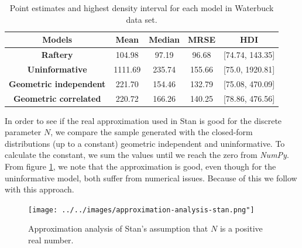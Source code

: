 \begin{table}[!ht]
    \centering
    \begin{tabular}{|c|c|c|c|c|}
        \hline
        {\bf Models} &     {\bf Mean} &  {\bf Median} &    {\bf MRSE} &    {\bf HDI} \\\hline
        {\bf Raftery} &   104.98 &   97.19 &   96.68 &  [74.74, 143.35] \\\hline
        {\bf Uninformative} &  1111.69 &  235.74 &  155.66 &  [75.0, 1920.81] \\\hline
        {\bf Geometric independent} &   221.70 &  154.46 &  132.79 &  [75.08, 470.09] \\\hline
        {\bf Geometric correlated} &   220.72 &  166.26 &  140.25 &  [78.86, 476.56] \\\hline
    \end{tabular}
    \caption{Point estimates and highest density interval for each model in Waterbuck data set.}
    \label{tab:summary-statistics-posterior-waterbuck}      
\end{table}

    In order to see if the real approximation used in Stan is good for the
    discrete parameter $N$, we compare the sample generated with the closed-form distributions
    (up to a constant) geometric independent and uninformative. To calculate
    the constant, we sum the values until we reach the zero from {\it NumPy}.
    From figure \ref{fig:approximation-stan}, we note that the approximation
    is good, even though for the uninformative model,
    both suffer from numerical issues.  Because of this we follow with this
    approach. 

\begin{figure}[!ht]
    \centering
    \texttt{[image: ../../images/approximation-analysis-stan.png"]}
    \caption{Approximation analysis of Stan's assumption that $N$ is a positive real number. }
    \label{fig:approximation-stan}
\end{figure}